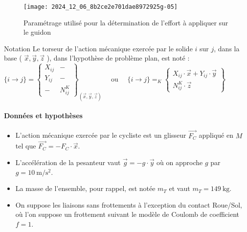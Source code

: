 \begin{figure}[!htb]
\begin{center}
\texttt{[image: 2024\_12\_06\_8b2ce2e701dae8972925g-05]}
\caption{Paramétrage utilisé pour la détermination de l'effort à appliquer sur le guidon \label{fig_25}}
\end{center}
\end{figure}


Notation Le torseur de l'action mécanique exercée par le solide \(i\) sur \(j\), dans la base ( \(\vec{x}, \vec{y}, \vec{z}\) ), dans l'hypothèse de problème plan, est noté :
$
\{i \rightarrow j\}=\left\{\begin{array}{c|c}
X_{i j} & - \\
Y_{i j} & - \\
- & N_{i j}^{K}
\end{array}\right\}_{(\vec{x}, \vec{y}, \vec{z})} \quad \text { ou } \quad\{i \rightarrow j\}=_{K}\left\{\begin{array}{c}
X_{i j} \cdot \vec{x}+Y_{i j} \cdot \vec{y} \\
N_{i j}^{K} \cdot \vec{z}
\end{array}\right\}
$

\paragraph*{Données et hypothèses}
\begin{itemize}
  \item L'action mécanique exercée par le cycliste est un glisseur \(\overrightarrow{F_{C}}\) appliqué en \(M\) tel que \(\overrightarrow{F_{C}}=-F_{C} \cdot \vec{x}\).
  \item L'accélération de la pesanteur vaut \(\vec{g}=-g \cdot \vec{y}\) où on approche \(g\) par \(g=10 \mathrm{~m} / \mathrm{s}^{2}\).
  \item La masse de l'ensemble, pour rappel, est notée \(m_{T}\) et vaut \(m_{T}=149 \mathrm{~kg}\).
  \item On suppose les liaisons sans frottements à l'exception du contact Roue/Sol, où l'on suppose un frottement suivant le modèle de Coulomb de coefficient \(f=1\).
\end{itemize}



